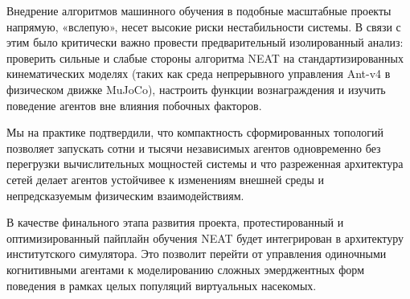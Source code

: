 Внедрение алгоритмов машинного обучения в подобные масштабные проекты напрямую, «вслепую», несет высокие риски нестабильности системы. В связи с этим было критически важно провести предварительный изолированный анализ: проверить сильные и слабые стороны алгоритма NEAT на стандартизированных кинематических моделях (таких как среда непрерывного управления Ant-v4 в физическом движке MuJoCo), настроить функции вознаграждения и изучить поведение агентов вне влияния побочных факторов.

Мы на практике подтвердили, что компактность сформированных топологий позволяет запускать сотни и тысячи независимых агентов одновременно без перегрузки вычислительных мощностей системы и что разреженная архитектура сетей делает агентов устойчивее к изменениям внешней среды и непредсказуемым физическим взаимодействиям.

В качестве финального этапа развития проекта, протестированный и оптимизированный пайплайн обучения NEAT будет интегрирован в архитектуру институтского симулятора. Это позволит перейти от управления одиночными когнитивными агентами к моделированию сложных эмерджентных форм поведения в рамках целых популяций виртуальных насекомых.